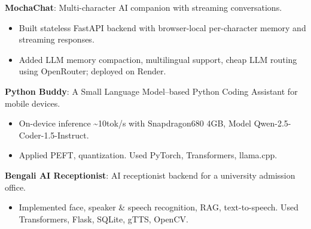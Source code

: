 
\begin{cvlistsection}

\item \textbf{MochaChat}: Multi-character AI companion with streaming conversations.
\href{https://github.com/2ufiq/mocha-chat}{\faGithub}  \href{https://mocha-chat.onrender.com/}{\textcolor{Cerulean}{\faExternalLink*}}
\begin{itemize}[leftmargin=2.5em, nosep, noitemsep]
  \item[\textendash] Built stateless FastAPI backend with browser-local per-character memory and streaming responses.
  \item[\textendash] Added LLM memory compaction, multilingual support, cheap LLM routing using OpenRouter; deployed on Render.
\end{itemize}

\item \textbf{Python Buddy}: A Small Language Model–based Python Coding Assistant for mobile devices.
\href{https://github.com/2ufiq/slm-python-buddy}{\faGithub}
\begin{itemize}[leftmargin=2.5em, nosep, noitemsep]
  \item[\textendash] On-device inference \~{}10tok/s with Snapdragon680 4GB, Model Qwen-2.5-Coder-1.5-Instruct. 
  \item[\textendash] Applied PEFT, quantization. Used PyTorch, Transformers, llama.cpp.
\end{itemize}

\item \textbf{Bengali AI Receptionist}: AI receptionist backend for a university admission office.
\href{https://github.com/2ufiq/Bengali-AI-Recieptionist}{\faGithub}
\begin{itemize}[leftmargin=2.5em, nosep, noitemsep]
  \item[\textendash] Implemented face, speaker \& speech recognition, RAG, text-to-speech. Used Transformers, Flask, SQLite, gTTS, OpenCV.
\end{itemize}
\end{cvlistsection}
